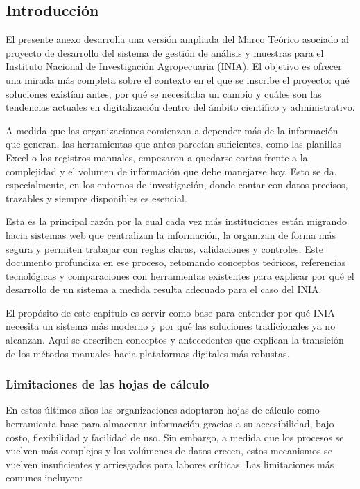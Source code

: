 
\subsection{Introducción}

El presente anexo desarrolla una versión ampliada del Marco Teórico asociado al proyecto de desarrollo del sistema de gestión de análisis y muestras para el Instituto Nacional de Investigación Agropecuaria (INIA). El objetivo es ofrecer una mirada más completa sobre el contexto en el que se inscribe el proyecto: qué soluciones existían antes, por qué se necesitaba un cambio y cuáles son las tendencias actuales en digitalización dentro del ámbito científico y administrativo.

A medida que las organizaciones comienzan a depender más de la información que generan, las herramientas que antes parecían suficientes, como las planillas Excel o los registros manuales, empezaron a quedarse cortas frente a la complejidad y el volumen de información que debe manejarse hoy. Esto se da, especialmente, en los entornos de investigación, donde contar con datos precisos, trazables y siempre disponibles es esencial.

Esta es la principal razón por la cual cada vez más instituciones están migrando hacia sistemas web que centralizan la información, la organizan de forma más segura y permiten trabajar con reglas claras, validaciones y controles. Este documento profundiza en ese proceso, retomando conceptos teóricos, referencias tecnológicas y comparaciones con herramientas existentes para explicar por qué el desarrollo de un sistema a medida resulta adecuado para el caso del INIA.

El propósito de este capitulo es servir como base para entender por qué INIA necesita un sistema más moderno y por qué las soluciones tradicionales ya no alcanzan. Aquí se describen conceptos y antecedentes que explican la transición de los métodos manuales hacia plataformas digitales más robustas.

\subsubsection{Limitaciones de las hojas de cálculo}

En estos últimos años las organizaciones adoptaron hojas de cálculo como herramienta base para almacenar información gracias a su accesibilidad, bajo costo, flexibilidad y facilidad de uso. Sin embargo, a medida que los procesos se vuelven más complejos y los volúmenes de datos crecen, estos mecanismos se vuelven insuficientes y arriesgados para labores críticas. Las limitaciones más comunes incluyen:

